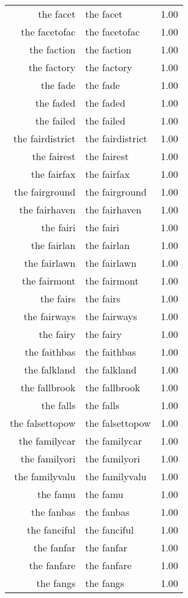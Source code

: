 \begin{table}[ht]
\begin{tabular}{rlr}
  the facet & the facet & 1.00 \\ 
  the facetofac & the facetofac & 1.00 \\ 
  the faction & the faction & 1.00 \\ 
  the factory & the factory & 1.00 \\ 
  the fade & the fade & 1.00 \\ 
  the faded & the faded & 1.00 \\ 
  the failed & the failed & 1.00 \\ 
  the fairdistrict & the fairdistrict & 1.00 \\ 
  the fairest & the fairest & 1.00 \\ 
  the fairfax & the fairfax & 1.00 \\ 
  the fairground & the fairground & 1.00 \\ 
  the fairhaven & the fairhaven & 1.00 \\ 
  the fairi & the fairi & 1.00 \\ 
  the fairlan & the fairlan & 1.00 \\ 
  the fairlawn & the fairlawn & 1.00 \\ 
  the fairmont & the fairmont & 1.00 \\ 
  the fairs & the fairs & 1.00 \\ 
  the fairways & the fairways & 1.00 \\ 
  the fairy & the fairy & 1.00 \\ 
  the faithbas & the faithbas & 1.00 \\ 
  the falkland & the falkland & 1.00 \\ 
  the fallbrook & the fallbrook & 1.00 \\ 
  the falls & the falls & 1.00 \\ 
  the falsettopow & the falsettopow & 1.00 \\ 
  the familycar & the familycar & 1.00 \\ 
  the familyori & the familyori & 1.00 \\ 
  the familyvalu & the familyvalu & 1.00 \\ 
  the famu & the famu & 1.00 \\ 
  the fanbas & the fanbas & 1.00 \\ 
  the fanciful & the fanciful & 1.00 \\ 
  the fanfar & the fanfar & 1.00 \\ 
  the fanfare & the fanfare & 1.00 \\ 
  the fangs & the fangs & 1.00 \\ 

\end{tabular}
\end{table}
